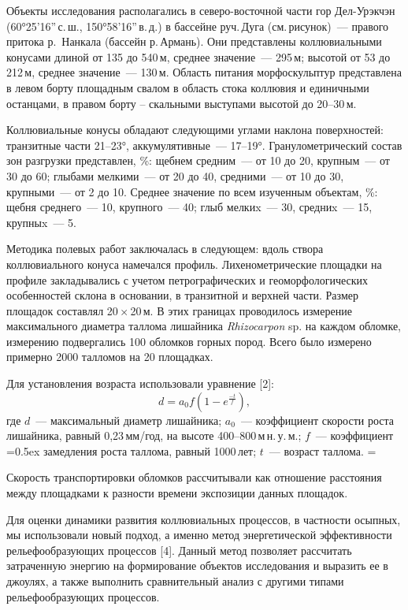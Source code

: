 Объекты исследования располагались в северо-восточной части гор Дел-Урэкчэн
(60°25’16”\,с.\,ш., 150°58’16”\,в.\,д.) в бассейне руч.\,Дуга (см.\,ри\-су\-нок)~--- правого
притока р. Нанкала (бассейн р.\,Армань). Они представлены коллювиальными конусами
длиной от 135 до 540\,м, среднее значение~--- 295\,м; высотой от 53 до 212\,м,
среднее значение~--- 130\,м. Область питания морфо\-скульптур представлена в левом
борту площадным свалом в область стока коллювия и единичными останцами, в правом
борту – скальными выступами высотой до 20–30\,м.



Коллювиальные конусы обладают следующими углами наклона поверхностей: транзитные
части 21–23°, аккумулятивные~--- 17–19°. Гранулометрический состав зон разгрузки
представлен, \%: щебнем средним~--- от 10 до 20, крупным~--- от 30 до 60; глыбами
мелкими~--- от 20 до 40, средними~--- от 10 до 30, крупными~--- от 2 до 10. Среднее
значение по всем изученным объектам, \%: щебня среднего~--- 10, крупного~--- 40;
глыб мелкиx~--- 30, средниx~--- 15, крупныx~--- 5.
\enlargethispage{\baselineskip}

Методика полевых работ заключалась в следующем: вдоль створа коллювиального
конуса намечался профиль. Лихенометрические площадки на профиле закладывались с
учетом петрографических и геоморфологических особенностей склона в основании, в
транзитной и верхней части. Размер площадок составлял 20\,×\,20\,м. В этих границах
проводилось измерение максимального диаметра таллома лишайника \emph{Rhizocarpon} sp.
на каждом обломке, измерению подвергались 100 обломков горных пород. Всего было
измерено примерно 2000 талломов на 20 площадках.

Для установления возраста использовали уравнение [2]:
\begin{equation}
d = a_0 f (1 - e^{\frac{-t}{f}}),
\end{equation}
где $d$~--- максимальный диаметр лишайника; $a_0$~--- коэффициент скорости роста
лишайника, равный 0,23\,мм/год, на высоте 400--800\,м\,н.\,у.\,м.; $f$~--- коэффициент
\font=0.5ex
замедления роста таллома, равный 1000\,лет; $t$~--- возраст таллома.
\font=\origiwspc

Скорость транспортировки обломков рассчитывали как отношение расстояния между
площадками к разности времени экспозиции данных площадок.

Для оценки динамики развития коллювиальных процессов, в частности осыпных, мы
использовали новый подход, а именно метод энергетической эффективности
рельефообразующих процессов [4]. Данный метод позволяет рассчитать затраченную
энергию на формирование объектов исследования и выразить ее в джоулях, а также
выполнить сравнительный анализ с другими типами рельефообразующих процессов.


